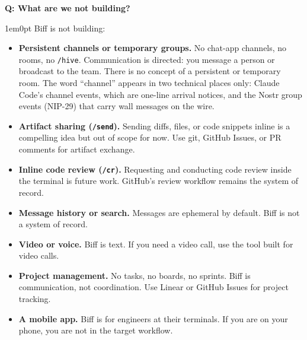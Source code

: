\documentclass[11pt,letterpaper]{article}
\newcounter{faqnum}
\newenvironment{faqpair}[1]{%
  \needspace{4\baselineskip}%
  \vspace{0.5em}%
  \refstepcounter{faqnum}%
  \noindent\textbf{\color{SectionBlue}Q\thefaqnum: #1}\par\nopagebreak[4]%
  \vspace{0.2em}%
  \begin{adjustwidth}{1em}{0pt}%
  \setlength{\parindent}{0pt}%
}{%
  \end{adjustwidth}%
  \vspace{0.5em}%
}
\begin{document}
\begin{faqpair}{What are we not building?}\label{faq:not-building}
  Biff is not building:
  \begin{itemize}[leftmargin=1.5em]
    \item \textbf{Persistent channels or temporary groups.} No chat-app
    channels, no rooms, no \texttt{/hive}. Communication is directed: you
    message a person or broadcast to the team. There is no concept of a
    persistent or temporary room. The word ``channel'' appears in two
    technical places only: Claude Code's channel events, which are one-line
    arrival notices, and the Nostr group events (NIP-29) that carry wall
    messages on the wire.
    \item \textbf{Artifact sharing (\texttt{/send}).} Sending diffs, files,
    or code snippets inline is a compelling idea but out of scope for now.
    Use git, GitHub Issues, or PR comments for artifact exchange.
    \item \textbf{Inline code review (\texttt{/cr}).} Requesting and
    conducting code review inside the terminal is future work. GitHub's
    review workflow remains the system of record.
    \item \textbf{Message history or search.} Messages are ephemeral by
    default. Biff is not a system of record.
    \item \textbf{Video or voice.} Biff is text. If you need a video call,
    use the tool built for video calls.
    \item \textbf{Project management.} No tasks, no boards, no sprints.
    Biff is communication, not coordination. Use Linear or GitHub
    Issues for project tracking.
    \item \textbf{A mobile app.} Biff is for engineers at their terminals.
    If you are on your phone, you are not in the target workflow.
  \end{itemize}
\end{faqpair}
\end{document}

